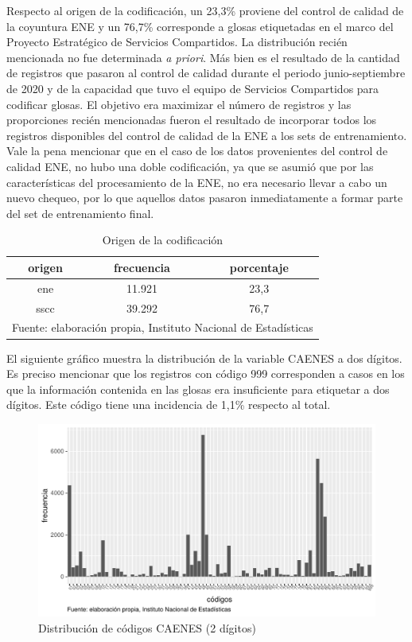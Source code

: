 \documentclass[
  12pt,
  spanish,
]{article}
\begin{document}
Respecto al origen de la codificación, un 23,3\% proviene del control de
calidad de la coyuntura ENE y un 76,7\% corresponde a glosas etiquetadas
en el marco del Proyecto Estratégico de Servicios Compartidos. La
distribución recién mencionada no fue determinada \emph{a priori}. Más
bien es el resultado de la cantidad de registros que pasaron al control
de calidad durante el periodo junio-septiembre de 2020 y de la capacidad
que tuvo el equipo de Servicios Compartidos para codificar glosas. El
objetivo era maximizar el número de registros y las proporciones recién
mencionadas fueron el resultado de incorporar todos los registros
disponibles del control de calidad de la ENE a los sets de
entrenamiento. Vale la pena mencionar que en el caso de los datos
provenientes del control de calidad ENE, no hubo una doble codificación,
ya que se asumió que por las características del procesamiento de la
ENE, no era necesario llevar a cabo un nuevo chequeo, por lo que
aquellos datos pasaron inmediatamente a formar parte del set de
entrenamiento final.

\begin{table}[H]

\caption{\label{tab:plotear tabla origen}\label{origen_cod}Origen de la codificación}
\centering
\fontsize{9.5}{11.5}\selectfont
\begin{tabular}[t]{ccc}
\toprule
origen & frecuencia & porcentaje\\
\midrule
ene & 11.921 & 23,3\\
sscc & 39.292 & 76,7\\
\bottomrule
\multicolumn{3}{l}{\rule{0pt}{1em}Fuente: elaboración propia, Instituto Nacional de Estadísticas }\\
\end{tabular}
\end{table}

El siguiente gráfico muestra la distribución de la variable CAENES a dos
dígitos. Es preciso mencionar que los registros con código 999
corresponden a casos en los que la información contenida en las glosas
era insuficiente para etiquetar a dos dígitos. Este código tiene una
incidencia de 1,1\% respecto al total.

\begin{figure}[H]
\centering
\large
\caption{Distribución de códigos CAENES (2 dígitos)}
\label{ciuo_distancia}
\includegraphics[width = \linewidth]{imagenes/distribucion_caenes.pdf}
\normalsize
\end{figure}
\end{document}
